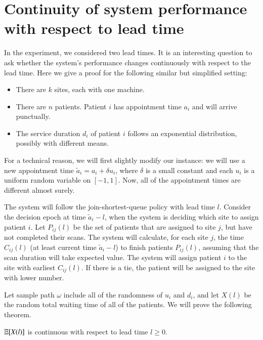 \section{Continuity of system performance with respect to lead time}

In the experiment, we considered two lead times. It is an interesting question
to ask whether the system's performance changes continuously with respect to
the lead time. Here we give a proof for the following similar but simplified setting:
\begin{itemize}
\item There are $k$ sites, each with one machine.
\item There are $n$ patients. Patient $i$ has appointment time $a_i$
      and will arrive punctually.
\item The service duration $d_i$ of patient $i$ follows an exponential
      distribution, possibly with different means.
\end{itemize}
For a technical reason, we will first slightly modify our instance:
we will use a new appointment time $\tilde a_i = a_i + \delta u_i$,
where $\delta$ is a small constant and each $u_i$ is a uniform
random variable on $[-1,1]$. Now, all of the appointment times
are different almost surely.

The system will follow the join-shortest-queue policy with lead time $l$.
Consider the decision epoch at time $\tilde a_i - l$, when the
system is deciding which site to assign patient $i$.
Let $P_{ij}(l)$ be the set of patients that are assigned to site $j$,
but have not completed their scans.
The system will calculate, for each site $j$, the time $C_{ij}(l)$
(at least current time $\tilde a_i - l$) to finish patients $P_{ij}(l)$,
assuming that the scan duration will take expected value. The system
will assign patient $i$ to the site with earliest $C_{ij}(l)$.
If there is a tie, the patient will be assigned to the site with
lower number.

Let sample path $\omega$ include all of the randomness of $u_i$ and $d_i$,
and let $X(l)$ be the random total waiting time of all of the patients.
We will prove the following theorem.

\begin{thm}
  $\operatorname*{\mathbb{E}}[X(l)]$ is continuous with respect to lead time $l \ge 0$.
\end{thm}


